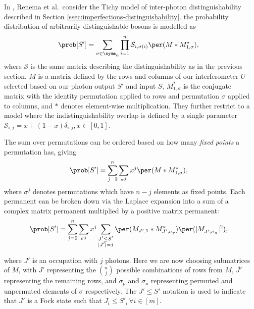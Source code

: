 In \cite{renema2018, renema2018loss}, Renema et al.\ consider the Tichy model of inter-photon distinguishability described in Section \ref{ssec:imperfections-distinguishability}. 
 the probability distribution of arbitrarily distinguishable bosons is modelled as
\begin{equation}
\prob[S'] = \sum_{\sigma\in\symm_n}\prod_{i=1}^n\mathcal{S}_{i,\sigma(i)}\per(M*M^*_{1,\sigma}) ,
\end{equation}
where $\mathcal{S}$ is the same matrix describing the distinguishability as in the previous section, $M$ is a matrix defined by the rows and columns of our interferometer $U$ selected based on our photon output $S'$ and input $S$, $M^*_{1,\sigma}$ is the conjugate matrix with the identity permutation applied to rows and permutation $\sigma$ applied to columns, and $*$ denotes element-wise multiplication. 
They further restrict to a model where the indistinguishability overlap is defined by a single parameter $\mathcal{S}_{i,j} = x + (1-x)\delta_{i,j}, x \in [0,1]$. 

The sum over permutations can be ordered based on how many \emph{fixed points} a permutation has, giving
\begin{equation}
\prob[S'] = \sum_{j=0}^n\sum_{\sigma^j}x^j\per(M*M^*_{1,\sigma}) , \label{eqn:renema-state}
\end{equation}
where $\sigma^j$ denotes permutations which have $n-j$ elements as fixed points.
Each permanent can be broken down via the Laplace expansion into a sum of a complex matrix permanent multiplied by a positive matrix permanent:
\begin{equation}
\prob[S'] = \sum_{j=0}^n\sum_{\sigma^j}x^j\sum_{\substack{J'\leq S'\\|J'|=j}}\per(M_{J',1}*M^*_{J',\sigma_p})\per(|M_{\bar{J'},\sigma_u}|^2) ,
\end{equation}

\noindent where $J'$ is an occupation with $j$ photons. Here we are now choosing submatrices of $M$, with $J'$ representing the $\binom{n}{j}$ possible combinations of rows from $M$, $\bar{J'}$ representing the remaining rows, and $\sigma_p$ and $\sigma_u$  representing permuted and unpermuted elements of $\sigma$ respectively.
The $J' \leq S'$ notation is used to indicate that $J'$ is a Fock state such that $J_i\leq S'_i \,\forall i\in[m]$.

